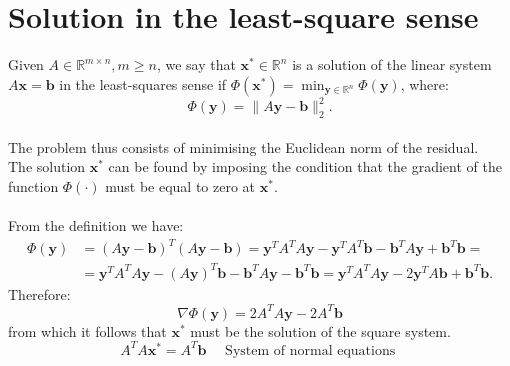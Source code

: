 \documentclass[11pt]{book}
\begin{document}
\section*{Solution in the least-square sense}
Given $A \in \mathbb{R}^{m \times n}, m \geq n$, we say that $\mathbf{x}^{*} \in \mathbb{R}^{n}$ is a solution of the linear system $A \mathbf{x}=\mathbf{b}$ in the least-squares sense if $\Phi\left(\mathbf{x}^{*}\right)=\min _{\mathbf{y} \in \mathbb{R}^{n}} \Phi(\mathbf{y})$,
where:
$$\Phi(\mathbf{y})=\|A \mathbf{y}-\mathbf{b}\|_{2}^{2}.$$\\
The problem thus consists of minimising the Euclidean norm of the residual.\\
The solution $\mathbf{x}^{*}$ can be found by imposing the condition that the gradient of the function $\Phi(\cdot)$ must be equal to zero at $\mathbf{x}^{*}$.\\ \\
From the definition we have:
$$
\begin{aligned}
\Phi(\mathbf{y}) & =(A \mathbf{y}-\mathbf{b})^{T}(A \mathbf{y}-\mathbf{b}) = \mathbf{y}^{T} A^{T} A \mathbf{y} - \mathbf{y}^TA^T\mathbf{b}-\mathbf{b}^T A \mathbf{y}+\mathbf{b}^{T} \mathbf{b} =  \\
&= \mathbf{y}^{T} A^{T} A \mathbf{y}- (A\mathbf{y})^T\mathbf{b}  -\mathbf{b}^T A \mathbf{y}- \mathbf{b}^{T} \mathbf{b}=\mathbf{y}^{T} A^{T} A \mathbf{y}-2 \mathbf{y}^{T} A \mathbf{b}+\mathbf{b}^{T} \mathbf{b}.
\end{aligned}
$$
Therefore:
$$
\nabla \Phi(\mathbf{y})=2 A^{T} A \mathbf{y}-2 A^{T} \mathbf{b}
$$
from which it follows that $\mathbf{x}^{*}$ must be the solution of the square system.
$$
A^{T} A \mathbf{x}^{*}=A^{T} \mathbf{b} \quad \text { System of normal equations }
$$
\end{document}
